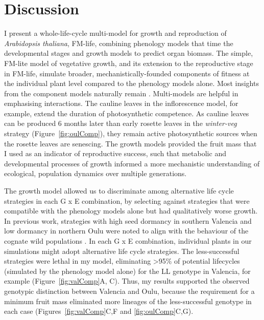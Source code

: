 \section{Discussion}
\label{sec:discussion}

I present a whole-life-cycle multi-model for growth and reproduction of
\emph{Arabidopsis thaliana}, FM-life, combining phenology models that time the
developmental stages and growth models to predict organ biomass. The simple,
FM-lite model of vegetative growth, and its extension to the reproductive stage
in FM-life, simulate broader, mechanistically-founded components of fitness at
the individual plant level compared to the phenology models alone. Most insights
from the component models naturally remain
\citep{rasse_leaf_2006,christophe_model-based_2008,
  wilczek_effects_2009,burghardt_modeling_2015}. Multi-models are helpful in
emphasising interactions. The cauline leaves in the inflorescence model, for
example, extend the duration of photosynthetic competence. As cauline leaves can
be produced 6 months later than early rosette leaves in the \emph{winter-veg}
strategy (Figure~\ref{fig:oulComp}), they remain active photosynthetic sources
\citep{earley_inflorescences_2009, leonardos_photosynthetic_2014} when the
rosette leaves are senescing. The growth models provided the fruit mass that I
used as an indicator of reproductive success, such that metabolic and
developmental processes of growth informed a more mechanistic understanding of
ecological, population dynamics over multiple generations.

The growth model allowed us to discriminate among alternative life cycle
strategies in each G x E combination, by selecting against strategies that were
compatible with the phenology models alone but had qualitatively worse
growth. In previous work, strategies with high seed dormancy in southern
Valencia and low dormancy in northern Oulu were noted to align with the
behaviour of the cognate wild populations \citep{atwell_genome-wide_2010,
  chiang_dog1_2011, mendez-vigo_altitudinal_2011, burghardt_data_2014}. In each
G x E combination, individual plants in our simulations might adopt alternative
life cycle strategies. The less-successful strategies were lethal in my model,
eliminating \textgreater{}95\% of potential lifecycles (simulated by the
phenology model alone) for the LL genotype in Valencia, for example
(Figure~\ref{fig:valComp}A, C). Thus, my results supported the observed
genotypic distinction between Valencia and Oulu, because the requirement for a
minimum fruit mass eliminated more lineages of the less-successful genotype in
each case (Figures~\ref{fig:valComp}C,F and \ref{fig:oulComp}C,G).

